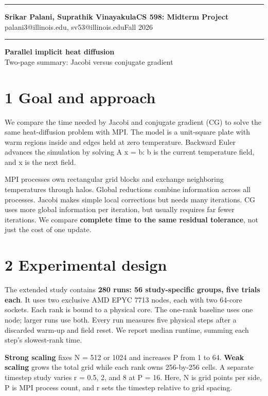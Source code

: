 \documentclass[11pt]{article}
\begin{document}
\noindent\rule{\linewidth}{2pt}
{\large\textbf{Srikar Palani, Suprathik Vinayakula}}\hfill\textbf{CS 598: Midterm Project}\\
palani3@illinois.edu, sv53@illinois.edu\hfill Fall 2026\\[-3pt]
\noindent\rule{\linewidth}{2pt}
\begin{center}{\Large\bfseries Parallel implicit heat diffusion}\\[3pt]
Two-page summary: Jacobi versus conjugate gradient\end{center}
\section*{1 Goal and approach}

We compare the time needed by Jacobi and conjugate gradient (CG) to solve the same heat-diffusion problem with MPI. The model is a unit-square plate with warm regions inside and edges held at zero temperature. Backward Euler advances the simulation by solving A x = b: b is the current temperature field, and x is the next field.

MPI processes own rectangular grid blocks and exchange neighboring temperatures through halos. Global reductions combine information across all processes. Jacobi makes simple local corrections but needs many iterations. CG uses more global information per iteration, but usually requires far fewer iterations. We compare \textbf{complete time to the same residual tolerance}, not just the cost of one update.

\section*{2 Experimental design}

The extended study contains \textbf{280 runs: 56 study-specific groups, five trials each}. It uses two exclusive AMD EPYC 7713 nodes, each with two 64-core sockets. Each rank is bound to a physical core. The one-rank baseline uses one node; larger runs use both. Every run measures five physical steps after a discarded warm-up and field reset. We report median runtime, summing each step's slowest-rank time.

\textbf{Strong scaling} fixes N = 512 or 1024 and increases P from 1 to 64. \textbf{Weak scaling} grows the total grid while each rank owns 256-by-256 cells. A separate timestep study varies r = 0.5, 2, and 8 at P = 16. Here, N is grid points per side, P is MPI process count, and r sets the timestep relative to grid spacing.
\end{document}
